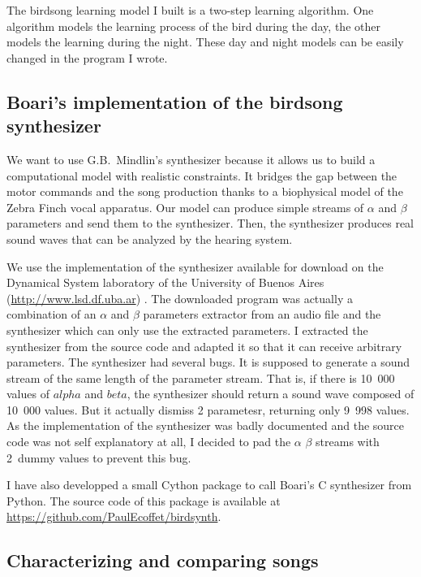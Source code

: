 \documentclass{report}
\begin{document}
The birdsong learning model I built is a two-step learning algorithm. One
algorithm models the learning process of the bird during the day, the other
models the learning during the night. These day and night models can be easily
changed in the program I wrote.

\subsection{Boari's implementation of the birdsong synthesizer}
\label{usage-of-boaris-implementation-of-the-birdsong-synthesizer}

We want to use G.B.~Mindlin's synthesizer because it allows us to build a
computational model with realistic constraints. It bridges the gap between the
motor commands and the song production thanks to a biophysical model of the
Zebra Finch vocal apparatus. Our model can produce simple streams of \(\alpha\)
and \(\beta\) parameters and send them to the synthesizer. Then, the synthesizer
produces real sound waves that can be analyzed by the hearing system.

We use the implementation of the synthesizer available for download on the
Dynamical System laboratory of the University of Buenos Aires
(\url{http://www.lsd.df.uba.ar}) \parencite{boari_automatic_2015}. The
downloaded program was actually a combination of an \(\alpha\) and \(\beta\)
parameters extractor from an audio file and the synthesizer which can only use
the extracted parameters. I extracted the synthesizer from the source code and
adapted it so that it can receive arbitrary parameters. The synthesizer had
several bugs. It is supposed to generate a sound stream of the same length of
the parameter stream. That is, if there is 10~000 values of \(alpha\) and
\(beta\), the synthesizer should return a sound wave composed of 10~000 values.
But it actually dismiss 2 parametesr, returning only 9~998 values. As the
implementation of the synthesizer was badly documented and the source code was
not self explanatory at all, I decided to pad the \(\alpha\) \(\beta\) streams
with 2 dummy values to prevent this bug.

I have also developped a small Cython package to call Boari's C synthesizer from
Python. The source code of this package is available at
\url{https://github.com/PaulEcoffet/birdsynth}.

\subsection{Characterizing and comparing songs}
\end{document}
